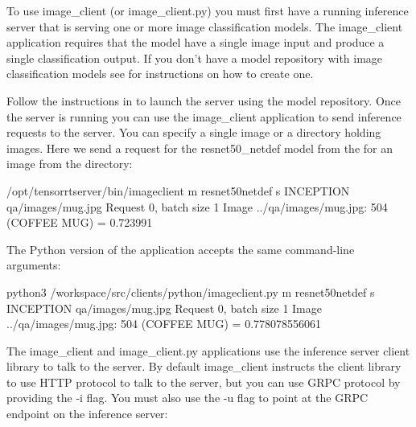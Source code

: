 \documentclass[letterpaper,10pt,english]{sphinxmanual}
\begin{document}
To use image\_client (or image\_client.py) you must first have a
running inference server that is serving one or more image
classification models. The image\_client application requires that the
model have a single image input and produce a single classification
output. If you don’t have a model repository with image classification
models see {\hyperref[\detokenize{run:section-example-model-repository}]{}} for instructions on
how to create one.

Follow the instructions in {\hyperref[\detokenize{run:section-running-the-inference-server}]{}}
to launch the server using the model repository. Once the server is
running you can use the image\_client application to send inference
requests to the server. You can specify a single image or a directory
holding images. Here we send a request for the resnet50\_netdef model
from the {\hyperref[\detokenize{run:section-example-model-repository}]{}} for an image from the 
directory:

\begin{sphinxVerbatim}[commandchars=\\\{\}]
\PYGZdl{} /opt/tensorrtserver/bin/image\PYGZus{}client \PYGZhy{}m resnet50\PYGZus{}netdef \PYGZhy{}s INCEPTION qa/images/mug.jpg
Request 0, batch size 1
Image \PYGZsq{}../qa/images/mug.jpg\PYGZsq{}:
    504 (COFFEE MUG) = 0.723991
\end{sphinxVerbatim}

The Python version of the application accepts the same command-line
arguments:

\begin{sphinxVerbatim}[commandchars=\\\{\}]
\PYGZdl{} python3 /workspace/src/clients/python/image\PYGZus{}client.py \PYGZhy{}m resnet50\PYGZus{}netdef \PYGZhy{}s INCEPTION qa/images/mug.jpg
Request 0, batch size 1
Image \PYGZsq{}../qa/images/mug.jpg\PYGZsq{}:
    504 (COFFEE MUG) = 0.778078556061
\end{sphinxVerbatim}

The image\_client and image\_client.py applications use the inference
server client library to talk to the server. By default image\_client
instructs the client library to use HTTP protocol to talk to the
server, but you can use GRPC protocol by providing the -i flag. You
must also use the -u flag to point at the GRPC endpoint on the
inference server:
\end{document}
